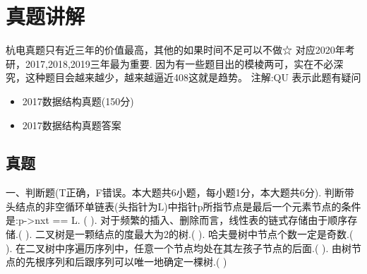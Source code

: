 
\chapter{真题讲解}
\label{chap21}

杭电真题只有近三年的价值最高，其他的如果时间不足可以不做☆ \newline
对应2020年考研，2017,2018,2019三年最为重要.\newline
因为有一些题目出的模棱两可，实在不必深究，这种题目会越来越少，越来越逼近408这就是趋势。\newline
注解:QU 表示此题有疑问\newline
\begin{itemize}[noitemsep,topsep=0pt,parsep=0pt,partopsep=0pt]
	\item 2017数据结构真题(150分)
	\item 2017数据结构真题答案
\end{itemize}


\section{真题}
一、判断题(T正确，F错误。本大题共6小题，每小题1分，本大题共6分). 判断带头结点的非空循环单链表(头指针为L)中指针p所指节点是最后一个元素节点的条件是:p->nxt == L. (  ). 对于频繁的插入、删除而言，线性表的链式存储由于顺序存储.(  ). 二叉树是一颗结点的度最大为2的树.(  ). 哈夫曼树中节点个数一定是奇数.(  ). 在二叉树中序遍历序列中，任意一个节点均处在其左孩子节点的后面.(  ). 由树节点的先根序列和后跟序列可以唯一地确定一棵树.(  )\newline
~\\

